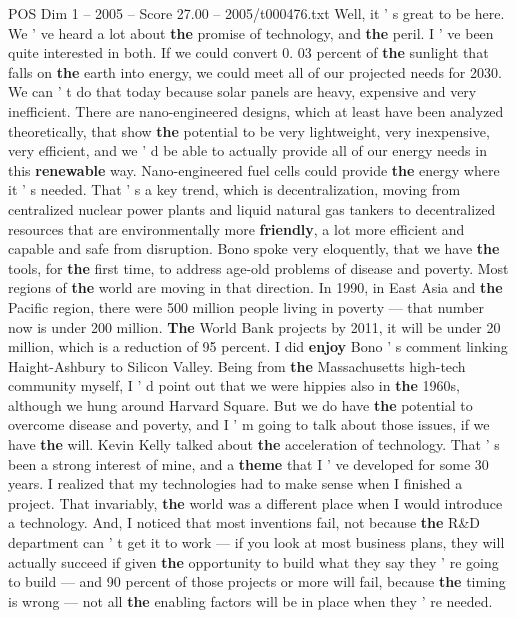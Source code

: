 \begin{textsample}{POS Dim 1 – 2005 – Score 27.00 – 2005/t000476.txt}  \label{ex:f1_pos_006}
Well, it ' s great to be here.
We ' ve heard a lot about \textbf{the} promise of technology, and \textbf{the} peril.
I ' ve been quite interested in both.
If we could convert 0. 03 percent of \textbf{the} sunlight that falls on \textbf{the} earth into energy, we could meet all of our projected needs for 2030.
We can ' t do that today because solar panels are heavy, expensive and very inefficient.
There are nano-engineered designs, which at least have been analyzed theoretically, that show \textbf{the} potential to be very lightweight, very inexpensive, very efficient, and we ' d be able to actually provide all of our energy needs in this \textbf{renewable} way.
Nano-engineered fuel cells could provide \textbf{the} energy where it ' s needed.
That ' s a key trend, which is decentralization, moving from centralized nuclear power plants and liquid natural gas tankers to decentralized resources that are environmentally more \textbf{friendly}, a lot more efficient and capable and safe from disruption.
Bono spoke very eloquently, that we have \textbf{the} tools, for \textbf{the} first time, to address age-old problems of disease and poverty.
Most regions of \textbf{the} world are moving in that direction.
In 1990, in East Asia and \textbf{the} Pacific region, there were 500 million people living in poverty — that number now is under 200 million. \textbf{The} World Bank projects by 2011, it will be under 20 million, which is a reduction of 95 percent.
I did \textbf{enjoy} Bono ' s comment linking Haight-Ashbury to Silicon Valley.
Being from \textbf{the} Massachusetts high-tech community myself, I ' d point out that we were hippies also in \textbf{the} 1960s, although we hung around Harvard Square.
But we do have \textbf{the} potential to overcome disease and poverty, and I ' m going to talk about those issues, if we have \textbf{the} will.
Kevin Kelly talked about \textbf{the} acceleration of technology.
That ' s been a strong interest of mine, and a \textbf{theme} that I ' ve developed for some 30 years.
I realized that my technologies had to make sense when I finished a project.
That invariably, \textbf{the} world was a different place when I would introduce a technology.
And, I noticed that most inventions fail, not because \textbf{the} R\&D department can ' t get it to work — if you look at most business plans, they will actually succeed if given \textbf{the} opportunity to build what they say they ' re going to build — and 90 percent of those projects or more will fail, because \textbf{the} timing is wrong — not all \textbf{the} enabling factors will be in place when they ' re needed.

\end{textsample}
